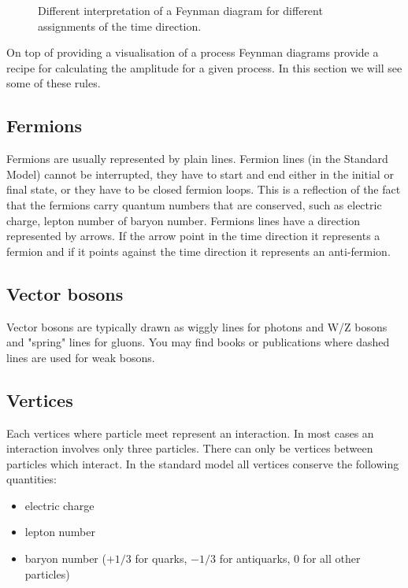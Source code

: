 \documentclass[12pt]{article}
\begin{document}
\begin{figure}[h]
\begin{center}
\end{center}
\caption{Different interpretation of a Feynman diagram for different assignments of the time direction.}\label{fig:timeDirection}
\end{figure}
On top of providing a visualisation of a process Feynman diagrams provide a recipe for calculating the amplitude for a given process. In this section we will see some of these rules.
\subsection{Fermions}
Fermions are usually represented by plain lines.  Fermion lines (in the Standard Model) cannot be interrupted, they have to start and end either in the initial or final state, or they have to be closed fermion loops. This is a reflection of the fact that the fermions carry quantum numbers that are conserved, such as electric charge, lepton number of baryon number. Fermions lines have a direction represented by arrows. If the arrow point in the time direction it represents a fermion and if it points against the time direction it represents an anti-fermion.  

\subsection{Vector bosons}

Vector bosons are typically drawn as wiggly lines for photons and W/Z bosons and  "spring" lines for gluons. You may find books or publications where dashed lines are used for weak bosons.

\subsection{Vertices}

Each vertices where particle meet represent an interaction. In most cases an interaction involves only three particles. There can only be vertices between particles which interact. In the standard model all vertices conserve the following quantities:
\begin{itemize}
\item electric charge
\item lepton number
\item baryon number ($+1/3$ for quarks, $-1/3$ for antiquarks, $0$ for all other particles)
\end{itemize}
\end{document}
